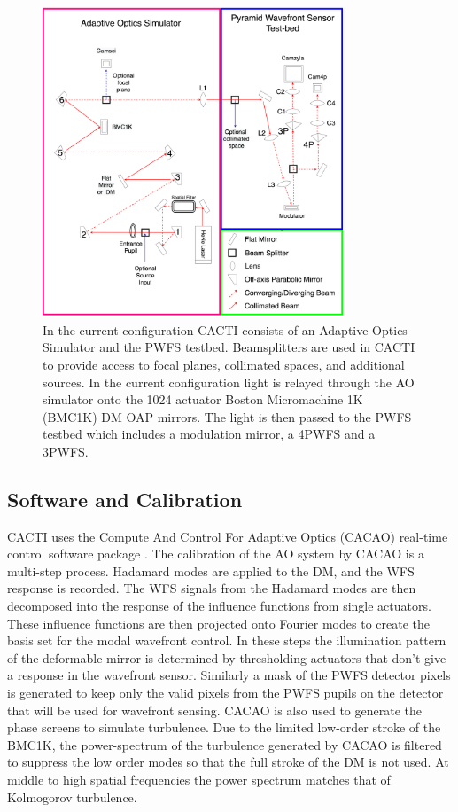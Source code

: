 \begin{figure}
    \centering
    \includegraphics[width=0.8\textwidth]{Chapter Materials/Chapter Five Materials/CACTI.png}
    \caption{In the current configuration CACTI consists of an Adaptive Optics Simulator and the PWFS testbed. Beamsplitters are used in CACTI to provide access to focal planes, collimated spaces, and additional sources. In the current configuration light is relayed through the AO simulator onto the 1024 actuator Boston Micromachine 1K (BMC1K) DM OAP mirrors. The light is then passed to the PWFS testbed which includes a modulation mirror, a 4PWFS and a 3PWFS.}
    \label{fig:CACTI}
\end{figure}

\subsection{Software and Calibration}

CACTI uses the Compute And Control For Adaptive Optics (CACAO) real-time control software package \cite{guyon2018compute}. The calibration of the AO system by CACAO is a multi-step process. Hadamard modes are applied to the DM, and the WFS response is recorded. The WFS signals from the Hadamard modes are then decomposed into the response of the influence functions from single actuators. These influence functions are then projected onto Fourier modes to create the basis set for the modal wavefront control. In these steps the illumination pattern of the deformable mirror is determined by thresholding actuators that don't give a response in the wavefront sensor. Similarly a mask of the PWFS detector pixels is generated to keep only the valid pixels from the PWFS pupils on the detector that will be used for wavefront sensing. CACAO is also used to generate the phase screens to simulate turbulence. Due to the limited low-order stroke of the BMC1K, the power-spectrum of the turbulence generated by CACAO is filtered to suppress the low order modes so that the full stroke of the DM is not used. At middle to high spatial frequencies the power spectrum matches that of Kolmogorov turbulence. 




